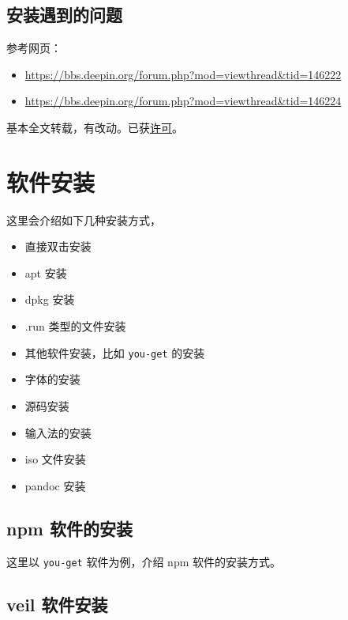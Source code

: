 \documentclass[doctor,openright,twoside]{sjtuthesis}
\providecommand{\tightlist}{%
    \setlength{\itemsep}{0pt}\setlength{\parskip}{0pt}}
\newcommand{\passthrough}[1]{#1}
\theoremstyle{plain}
\theoremstyle{definition}
\theoremstyle{remark}
\theoremstyle{ocrenumbox}
\theoremstyle{plain}
\begin{document}
\section{安装遇到的问题}

参考网页：

\begin{itemize}
\tightlist
\item
  \url{https://bbs.deepin.org/forum.php?mod=viewthread\&tid=146222}
\item
  \url{https://bbs.deepin.org/forum.php?mod=viewthread\&tid=146224}
\end{itemize}

基本全文转载，有改动。已获\href{https://bbs.deepin.org/forum.php?mod=viewthread\&tid=146224\&page=1\#pid384937}{许可}。

\hypertarget{software-install}{%
\chapter{软件安装}\label{software-install}}

这里会介绍如下几种安装方式，

\begin{itemize}
\tightlist
\item
  直接双击安装
\item
  apt 安装
\item
  dpkg 安装
\item
  .run 类型的文件安装
\item
  其他软件安装，比如 \passthrough{\lstinline!you-get!} 的安装
\item
  字体的安装
\item
  源码安装
\item
  输入法的安装
\item
  iso 文件安装
\item
  pandoc 安装
\end{itemize}

\hypertarget{npm-}{%
\section{npm 软件的安装}\label{npm-}}

这里以 \passthrough{\lstinline!you-get!} 软件为例，介绍 npm
软件的安装方式。

\hypertarget{veil-}{%
\section{veil 软件安装}\label{veil-}}
\end{document}
